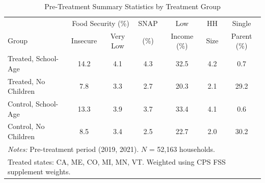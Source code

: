 \begin{table}[t]
\centering
\caption{Pre-Treatment Summary Statistics by Treatment Group}
\label{tab:summary}
\small
\begin{tabular}{lcccccc}
\hline\hline
 & \multicolumn{2}{c}{Food Security (\%)} & SNAP & Low & HH & Single \\
Group & Insecure & Very Low & (\%) & Income (\%) & Size & Parent (\%) \\
\hline
Treated, School-Age & 14.2 & 4.1 & 4.3 & 32.5 & 4.2 & 0.7 \\
Treated, No Children & 7.8 & 3.3 & 2.7 & 20.3 & 2.1 & 29.2 \\
\addlinespace
Control, School-Age & 13.3 & 3.9 & 3.7 & 33.4 & 4.1 & 0.6 \\
Control, No Children & 8.5 & 3.4 & 2.5 & 22.7 & 2.0 & 30.2 \\
\hline
\multicolumn{7}{l}{\footnotesize \textit{Notes:} Pre-treatment period (2019, 2021). $N$ = 52,163 households.} \\
\multicolumn{7}{l}{\footnotesize Treated states: CA, ME, CO, MI, MN, VT. Weighted using CPS FSS supplement weights.} \\
\end{tabular}
\end{table}
